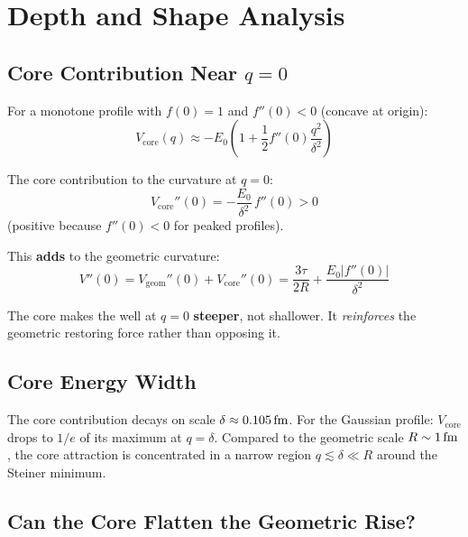 \section{Depth and Shape Analysis}
\label{sec:P2N7:depth}

\subsection{Core Contribution Near $q = 0$}

For a monotone profile with $f(0) = 1$ and $f''(0) < 0$ (concave at
origin):
\begin{equation}
    V_{\mathrm{core}}(q) \approx -E_0
    \left(1 + \frac{1}{2} f''(0) \frac{q^2}{\delta^2}\right)
    \label{eq:N7_Vcore_expand}
\end{equation}

The core contribution to the curvature at $q = 0$:
\begin{equation}
    V_{\mathrm{core}}''(0) = -\frac{E_0}{\delta^2}\, f''(0) > 0
    \label{eq:N7_Vcore_curvature}
\end{equation}
(positive because $f''(0) < 0$ for peaked profiles).

This \textbf{adds} to the geometric curvature:
\begin{equation}
    V''(0) = V_{\mathrm{geom}}''(0) + V_{\mathrm{core}}''(0)
    = \frac{3\tau}{2R} + \frac{E_0 |f''(0)|}{\delta^2}
    \label{eq:N7_V_curvature_total}
\end{equation}

The core makes the well at $q = 0$ \textbf{steeper}, not shallower. It
\emph{reinforces} the geometric restoring force rather than opposing it.

\subsection{Core Energy Width}

The core contribution decays on scale $\delta \approx 0.105\,\mathrm{fm}$. For
the Gaussian profile: $V_{\mathrm{core}}$ drops to $1/e$ of its maximum
at $q = \delta$. Compared to the geometric scale $R \sim 1\,\mathrm{fm}$, the
core attraction is concentrated in a narrow region $q \lesssim \delta
\ll R$ around the Steiner minimum.

\subsection{Can the Core Flatten the Geometric Rise?}

